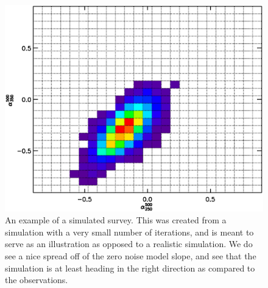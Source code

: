 \documentclass[twocolumn,letterpaper,10pt]{article}
\begin{document}
\begin{onecolumn}
\begin{figure}
\includegraphics[width=\textwidth]{model_color_hist.eps}
\caption{An example of a simulated survey. This was created from a simulation with a very small number of iterations, and is meant to serve as an illustration as opposed to a realistic simulation. We do see a nice spread off of the zero noise model slope, and see that the simulation is at least heading in the right direction as compared to the observations.}
\label{simmed}
\end{figure}


\end{onecolumn}
\end{document}
